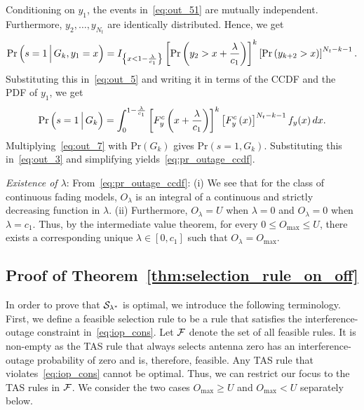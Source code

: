 \documentclass[12pt,draftcls,peerreview,onecolumn]{IEEEtran}
\newcommand{\brac}[1]{\left({#1}\right)}
\newcommand{\cbrac}[1]{\left\{{#1}\right\}}
\newcommand{\indic}[1]{I_{\cbrac{#1}}}
\newcommand{\prob}[1]{\text{Pr}\brac{#1}}
\newcommand{\given}{\arrowvert}
\newcommand{\Given}{\Big\arrowvert}
\newcommand{\setG}{G}
\newcommand{\setGk}{\setG_k}
\newcommand{\lam}{\lambda}
\newcommand{\F}{\cal{F}}
\newcommand{\Nt}{{N_t}}
\newcommand{\outmax}{O_{\text{max}}}
\newcommand{\cone}{c_{1}}
\newcommand{\out}{O}
\newcommand{\m}{\cone}
\newcommand{\lambym}{\frac{\lam}{\m}}
\newcommand{\yk}[1]{y_{#1}}
\newcommand{\un}{U}
\newcommand{\outlam}{\out_{\lam}}
\newcommand{\callamstarrule}{\cal S_{\lam^{*}}}
\begin{document}
Conditioning on $\yk{1}$, the events in~\eqref{eq:out_51} are mutually independent. Furthermore, $\yk{2},\ldots,\yk{\Nt} $ are identically distributed. Hence, we get
%
\begin{equation}
\text{Pr}\brac{s=1\Given \setGk, \yk{1}=x} = \indic{x<1-\lambym}\left[\text{Pr}\brac{\yk{2}>x+\lambym}\right]^{k} \left[\text{Pr}\brac{\yk{k+2}>x}\right]^{\Nt-k-1}.
\label{eq:out_6}
\end{equation}
%
Substituting this in~\eqref{eq:out_5} and writing it in terms of the CCDF and the PDF of $\yk{1}$, we get 
\begin{equation}
\text{Pr}\brac{s=1\Given\setGk} =\int_{0}^{1-\lambym}\left[F_{y}^{c}\left(x+\lambym\right)\right]^k \left[F_{y}^{c}\left(x\right)\right]^{\Nt-k-1}f_{y}(x)\,dx.
\label{eq:out_7}
\end{equation}
Multiplying~\eqref{eq:out_7} with $\prob{\setGk}$ gives $\prob{s=1,\setGk}$. Substituting this in~\eqref{eq:out_3} and simplifying yields~\eqref{eq:pr_outage_ccdf}.

{\em Existence of $\lam$}: From~\eqref{eq:pr_outage_ccdf}: (i) We see that for the class of continuous fading models, $\outlam$ is an integral of a continuous and strictly decreasing  function in $\lam$. %
(ii) Furthermore, $\outlam=\un$ when $\lam=0$ and $\outlam=0$ when $\lam=\cone$. Thus, by the intermediate value theorem, for every $0\leq\outmax\leq\un$,  there exists a corresponding unique $\lam\in[0,\m]$ such that $\outlam=\outmax$. 
  

		

\subsection{Proof of Theorem~\ref{thm:selection_rule_on_off}}
\label{proof:selection_rule_on_off}
In order to prove that $\callamstarrule$ is optimal, we introduce the following terminology. First, we define a feasible selection rule to be a rule that satisfies the interference-outage constraint in~\eqref{eq:iop_cons}. Let $\F$ denote the set of all feasible rules. It is non-empty as the TAS rule that always selects antenna zero has an interference-outage probability of zero and is, therefore, feasible. Any TAS rule that violates~\eqref{eq:iop_cons} cannot be optimal. Thus, we can restrict our focus to the TAS rules in $\F$. We consider the two cases $\outmax\geq\un$ and $\outmax<\un$ separately below.
\end{document}
